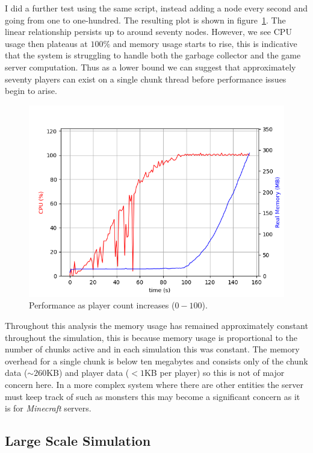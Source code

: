 \documentclass[12pt,notitlepage,a4paper]{report}
\begin{document}
	I did a further test using the same script, instead adding a node every second and going from one to one-hundred. The resulting plot is shown in figure~\ref{fig:linear100}. The linear relationship persists up to around seventy nodes. However, we see CPU usage then plateaus at $100\%$ and memory usage starts to rise, this is indicative that the system is struggling to handle both the garbage collector and the game server computation. Thus as a lower bound we can suggest that approximately seventy players can exist on a single chunk thread before performance issues begin to arise.
	\begin{figure}[!ht]
		\includegraphics[width=\textwidth]{linear100.png}
		\caption{Performance as player count increases ($0-100$).}
		\label{fig:linear100}
	\end{figure}

	Throughout this analysis the memory usage has remained approximately constant throughout the simulation, this is because memory usage is proportional to the number of chunks active and in each simulation this was constant. The memory overhead for a single chunk is below ten megabytes and consists only of the chunk data ($\sim260$KB) and player data ($<1$KB per player) so this is not of major concern here. In a more complex system where there are other entities the server must keep track of such as monsters this may become a significant concern as it is for \emph{Minecraft} servers.
	
	\subsection{Large Scale Simulation}
\end{document}
